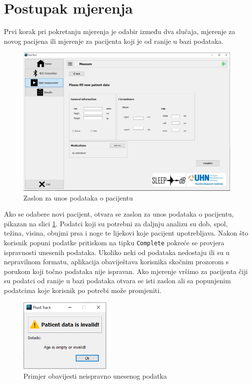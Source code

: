 \documentclass[../diplomski_rad.tex]{subfiles}
\begin{document}
\section{Postupak mjerenja}

Prvi korak pri pokretanju mjerenja je odabir između dva slučaja, mjerenje za novog pacijena ili 
mjerenje za pacijenta koji je od ranije u bazi podataka.

\begin{figure}[htb]
    \centering
    \includegraphics[width=1\textwidth]{Figures/patient.png} 
    \caption{Zaslon za unos podataka o pacijentu}
    \label{slk:patient}
\end{figure}

Ako se odabere novi pacijent, otvara se zaslon za unos podataka o pacijentu, pikazan na slici \ref{slk:patient}. 
Podatci koji su potrebni za daljnju analizu su dob, spol, težina, visina, obujmi prsa i noge te lijekovi koje pacijent upotrebljava. 
Nakon što korisnik popuni podatke pritiskom na tipku \texttt{Complete} pokreće se provjera ispravnosti unesenih podataka. 
Ukoliko neki od podataka nedostaju ili su u nepravilnom formatu, aplikacija obaviještava korisnika skočnim prozorom s 
porukom koji točno podataka nije ispravan. 
Ako mjerenje vršimo za pacijenta čiji su podatci od ranije u bazi podataka otvara se isti zaslon ali sa popunjenim podatcima 
koje korisnik po potrebi može promjeniti.  

\begin{figure}[htb]
    \centering
    \includegraphics[width=0.4\textwidth]{Figures/invalid_data.png} 
    \caption{Primjer obavijesti neispravno unesenog podatka}
    \label{slk:invalid_data}
\end{figure}
\end{document}
